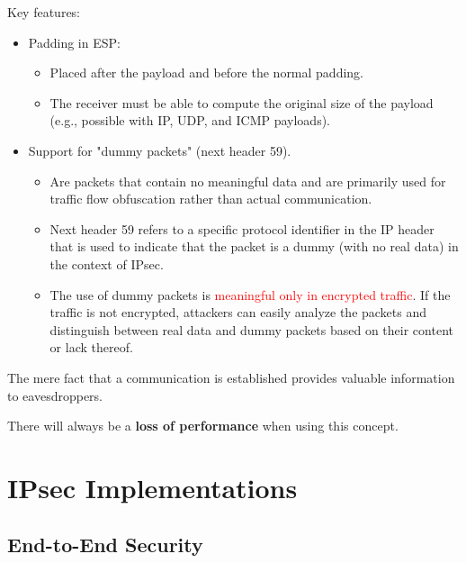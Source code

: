 Key features:
\begin{itemize}
    \item Padding in ESP:
    \begin{itemize}
        \item Placed after the payload and before the normal padding.
        \item The receiver must be able to compute the original size of the payload (e.g., possible with IP, UDP, and ICMP payloads).
    \end{itemize}
    \item Support for "dummy packets" (next header 59).
        \begin{itemize}
            \item Are packets that contain no meaningful data and are primarily used for traffic flow obfuscation rather than actual communication.
            \item Next header 59 refers to a specific protocol identifier in the IP header that is used to indicate that the packet is a dummy (with no real data) in the context of IPsec.
            \item The use of dummy packets is \textcolor{red}{meaningful only in encrypted traffic}. If the traffic is not encrypted, attackers can easily analyze the packets and distinguish between real data and dummy packets based on their content or lack thereof.
        \end{itemize}
\end{itemize}

\begin{tcolorbox}[colback=blue!10!white, colframe=blue!50!white, title=Cool Information]
    The mere fact that a communication is established provides valuable information to eavesdroppers.
\end{tcolorbox}

\begin{tcolorbox}[colback=red!10!white, colframe=red!70!black, coltitle=white, title=Beware]
        There will always be a \textbf{loss of performance} when using this concept.
\end{tcolorbox}

\section{IPsec Implementations}

\subsection{End-to-End Security}

